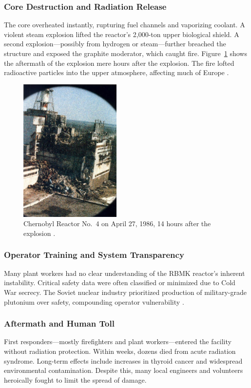\documentclass[12pt]{article}
\begin{document}
\subsubsection{Core Destruction and Radiation Release}
The core overheated instantly, rupturing fuel channels and vaporizing coolant. A violent steam explosion lifted the reactor’s 2,000-ton upper biological shield. A second explosion—possibly from hydrogen or steam—further breached the structure and exposed the graphite moderator, which caught fire. Figure~\ref{fig:chernobylafter} shows the aftermath of the explosion mere hours after the explosion. The fire lofted radioactive particles into the upper atmosphere, affecting much of Europe \autocite{nrc_chernobyl}.

\begin{figure}[H]
  \centering
  \includegraphics[width=0.45\textwidth]{chernobylafter.jpg}
  \caption{Chernobyl Reactor No.~4 on April 27, 1986, 14 hours after the explosion \autocite{medvedev1991truth}.}
  \label{fig:chernobylafter}
\end{figure}

\subsubsection{Operator Training and System Transparency}
Many plant workers had no clear understanding of the RBMK reactor's inherent instability. Critical safety data were often classified or minimized due to Cold War secrecy. The Soviet nuclear industry prioritized production of military-grade plutonium over safety, compounding operator vulnerability \autocite{medvedev1991truth}.

\subsubsection{Aftermath and Human Toll}
First responders—mostly firefighters and plant workers—entered the facility without radiation protection. Within weeks, dozens died from acute radiation syndrome. Long-term effects include increases in thyroid cancer and widespread environmental contamination. Despite this, many local engineers and volunteers heroically fought to limit the spread of damage.
\end{document}
